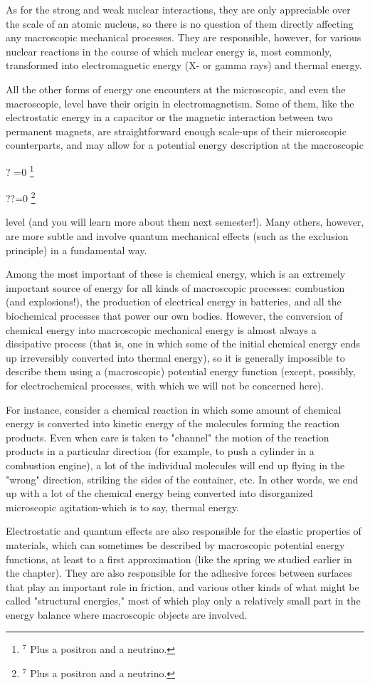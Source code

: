 \documentclass[10pt]{article}
\let\svthefootnote\thefootnote
\newcommand\blfootnotetext[1]{%
  \let\thefootnote\relax\footnote{#1}%
  \addtocounter{footnote}{-1}%
  \let\thefootnote\svthefootnote%
}
\let\svfootnotetext\footnotetext
\renewcommand\footnotetext[2][?]{%
  \if\relax#1\relax%
    \ifnum\value{footnote}=0\blfootnotetext{#2}\else\svfootnotetext{#2}\fi%
  \else%
    \if?#1\ifnum\value{footnote}=0\blfootnotetext{#2}\else\svfootnotetext{#2}\fi%
    \else\svfootnotetext[#1]{#2}\fi%
  \fi
}
\begin{document}
As for the strong and weak nuclear interactions, they are only appreciable over the scale of an atomic nucleus, so there is no question of them directly affecting any macroscopic mechanical processes. They are responsible, however, for various nuclear reactions in the course of which nuclear energy is, most commonly, transformed into electromagnetic energy (X- or gamma rays) and thermal energy.

All the other forms of energy one encounters at the microscopic, and even the macroscopic, level have their origin in electromagnetism. Some of them, like the electrostatic energy in a capacitor or the magnetic interaction between two permanent magnets, are straightforward enough scale-ups of their microscopic counterparts, and may allow for a potential energy description at the macroscopic

level (and you will learn more about them next semester!). Many others, however, are more subtle and involve quantum mechanical effects (such as the exclusion principle) in a fundamental way.

Among the most important of these is chemical energy, which is an extremely important source of energy for all kinds of macroscopic processes: combustion (and explosions!), the production of electrical energy in batteries, and all the biochemical processes that power our own bodies. However, the conversion of chemical energy into macroscopic mechanical energy is almost always a dissipative process (that is, one in which some of the initial chemical energy ends up irreversibly converted into thermal energy), so it is generally impossible to describe them using a (macroscopic) potential energy function (except, possibly, for electrochemical processes, with which we will not be concerned here).

For instance, consider a chemical reaction in which some amount of chemical energy is converted into kinetic energy of the molecules forming the reaction products. Even when care is taken to "channel" the motion of the reaction products in a particular direction (for example, to push a cylinder in a combustion engine), a lot of the individual molecules will end up flying in the "wrong" direction, striking the sides of the container, etc. In other words, we end up with a lot of the chemical energy being converted into disorganized microscopic agitation-which is to say, thermal energy.

Electrostatic and quantum effects are also responsible for the elastic properties of materials, which can sometimes be described by macroscopic potential energy functions, at least to a first approximation (like the spring we studied earlier in the chapter). They are also responsible for the adhesive forces between surfaces that play an important role in friction, and various other kinds of what might be called "structural energies," most of which play only a relatively small part in the energy balance where macroscopic objects are involved.
\end{document}
